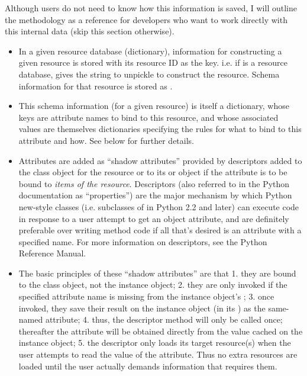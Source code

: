 \documentclass{howto}
\begin{document}
Although users do not need to know
how this information is saved, I will outline the methodology
as a reference for developers who want to work directly with this
internal data (skip this section otherwise).
\begin{itemize}
\item In a given resource database (dictionary), information for constructing a 
given resource  is stored with its resource ID as the key.  
i.e. if  is a resource database,  gives
the string to unpickle to construct the resource.  Schema information
for that resource is stored as .

\item This schema information (for a given resource) is itself
a dictionary, whose keys are attribute names to bind to this 
resource, and whose associated values are themselves dictionaries
specifying the rules for what to bind to this attribute and how.
See below for further details.

\item Attributes are added as ``shadow attributes'' provided by 
descriptors added to the class object for the resource or to
its  or  object if the
attribute is to be bound to {\em items of the resource}.  Descriptors
(also referred to in the Python documentation as ``properties'')
are the major mechanism by which Python new-style classes
(i.e. subclasses of  in Python 2.2 and later)
can execute code in response to a user attempt to get an
object attribute, and are definitely preferable over writing
 method code if all that's desired
is an attribute with a specified name.  For more information
on descriptors, see the Python Reference Manual.

\item The basic principles of these ``shadow attributes'' are that
1. they are bound to the class object, not the instance object;
2. they are only invoked if the specified attribute name is 
missing from the instance object's ; 
3. once invoked, they save their
result on the instance object (in its )
as the same-named attribute; 4. thus, the descriptor method
will only be called once; thereafter the attribute will be 
obtained directly from the value cached on the instance object;
5. the descriptor only loads its target resource(s) when the user
attempts to read the value of the attribute.  Thus no extra
resources are loaded until the user actually demands information
that requires them.


\end{itemize}
\end{document}
